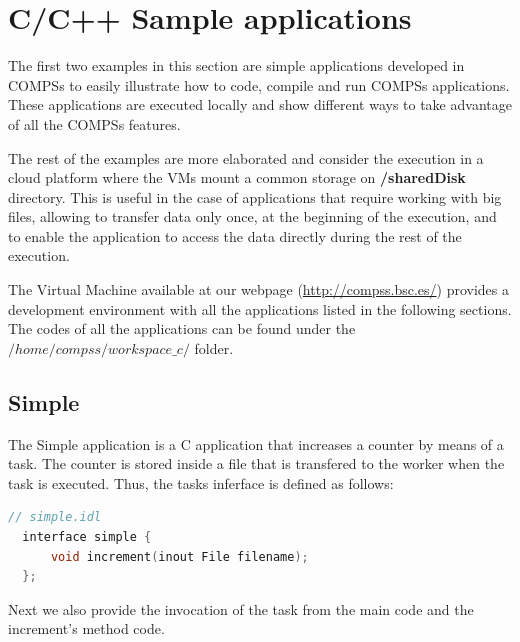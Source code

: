 \section{C/C++ Sample applications}
\label{sec:CSampleApps}

The first two examples in this section are simple applications developed in COMPSs to easily illustrate how to code,
compile and run COMPSs applications. These applications are executed locally and show different ways to take advantage
of all the COMPSs features. 

The rest of the examples are more elaborated and consider the execution in a cloud platform where the VMs mount a common 
storage on \textbf{/sharedDisk} directory. This is useful in the case of applications that require working 
with big files, allowing to transfer data only once, at the beginning of the execution, and to enable 
the application to access the data directly during the rest of the execution.

The Virtual Machine available at our webpage (\url{http://compss.bsc.es/}) provides a development environment with
all the applications listed in the following sections. The codes of all the applications can be found under the 
$/home/compss/workspace\_c/$ folder. 


\subsection{Simple}
The Simple application is a C application that increases a counter by means of a task. The counter is stored inside a file that 
is transfered to the worker when the task is executed. Thus, the tasks inferface is defined as follows:

\begin{lstlisting}[language=c]
  // simple.idl
  interface simple {
	  void increment(inout File filename);
  };
\end{lstlisting}

Next we also provide the invocation of the task from the main code and the increment's method code.

